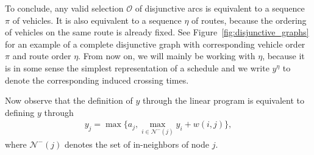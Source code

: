 \documentclass[a4paper]{report}
\theoremstyle{definition}
\theoremstyle{plain}
\begin{document}

To conclude, any valid selection $\mathcal{O}$ of disjunctive arcs is equivalent
to a sequence $\pi$ of vehicles. It is also equivalent to a sequence $\eta$ of
routes, because the ordering of vehicles on the same route is already fixed. See
Figure~\ref{fig:disjunctive_graphs} for an example of a complete disjunctive
graph with corresponding vehicle order $\pi$ and route order $\eta$. From now
on, we will mainly be working with $\eta$, because it is in some sense the
simplest representation of a schedule and we write $y^{\eta}$ to denote the
corresponding induced crossing times.

Now observe that the definition of $y$ through the linear program is equivalent
to defining $y$ through
\begin{align}
  \label{eq:y_max}
  y_{j} = \max\{ a_{j}, \max_{i \in \mathcal{N}^{-}(j)} y_i + w(i,j) \} ,
\end{align}
where $\mathcal{N}^{-}(j)$ denotes the set of in-neighbors of node $j$.
\end{document}
